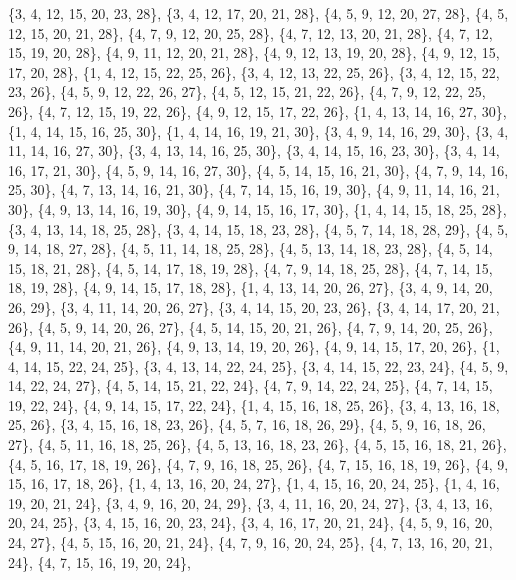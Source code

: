 \documentclass[11pt,a4paper]{article}
\begin{document}
{\{3, 4, 12, 15, 20, 23, 28\}, \{3, 4, 12, 17, 20, 21, 28\}, \{4, 5, 9, 12, 20, 27, 28\}, \{4, 5, 12, 15, 20, 21, 28\}, \{4, 7, 9, 12, 20, 25, 28\},
\{4, 7, 12, 13, 20, 21, 28\}, \{4, 7, 12, 15, 19, 20, 28\}, \{4, 9, 11, 12, 20, 21, 28\}, \{4, 9, 12, 13, 19, 20, 28\}, \{4, 9, 12, 15, 17, 20, 28\},
\{1, 4, 12, 15, 22, 25, 26\}, \{3, 4, 12, 13, 22, 25, 26\}, \{3, 4, 12, 15, 22, 23, 26\}, \{4, 5, 9, 12, 22, 26, 27\}, \{4, 5, 12, 15, 21, 22, 26\},
\{4, 7, 9, 12, 22, 25, 26\}, \{4, 7, 12, 15, 19, 22, 26\}, \{4, 9, 12, 15, 17, 22, 26\}, \{1, 4, 13, 14, 16, 27, 30\}, \{1, 4, 14, 15, 16, 25, 30\},
\{1, 4, 14, 16, 19, 21, 30\}, \{3, 4, 9, 14, 16, 29, 30\}, \{3, 4, 11, 14, 16, 27, 30\}, \{3, 4, 13, 14, 16, 25, 30\}, \{3, 4, 14, 15, 16, 23, 30\},
\{3, 4, 14, 16, 17, 21, 30\}, \{4, 5, 9, 14, 16, 27, 30\}, \{4, 5, 14, 15, 16, 21, 30\}, \{4, 7, 9, 14, 16, 25, 30\}, \{4, 7, 13, 14, 16, 21, 30\},
\{4, 7, 14, 15, 16, 19, 30\}, \{4, 9, 11, 14, 16, 21, 30\}, \{4, 9, 13, 14, 16, 19, 30\}, \{4, 9, 14, 15, 16, 17, 30\}, \{1, 4, 14, 15, 18, 25, 28\},
\{3, 4, 13, 14, 18, 25, 28\}, \{3, 4, 14, 15, 18, 23, 28\}, \{4, 5, 7, 14, 18, 28, 29\}, \{4, 5, 9, 14, 18, 27, 28\}, \{4, 5, 11, 14, 18, 25, 28\},
\{4, 5, 13, 14, 18, 23, 28\}, \{4, 5, 14, 15, 18, 21, 28\}, \{4, 5, 14, 17, 18, 19, 28\}, \{4, 7, 9, 14, 18, 25, 28\}, \{4, 7, 14, 15, 18, 19, 28\},
\{4, 9, 14, 15, 17, 18, 28\}, \{1, 4, 13, 14, 20, 26, 27\}, \{3, 4, 9, 14, 20, 26, 29\}, \{3, 4, 11, 14, 20, 26, 27\}, \{3, 4, 14, 15, 20, 23, 26\},
\{3, 4, 14, 17, 20, 21, 26\}, \{4, 5, 9, 14, 20, 26, 27\}, \{4, 5, 14, 15, 20, 21, 26\}, \{4, 7, 9, 14, 20, 25, 26\}, \{4, 9, 11, 14, 20, 21, 26\},
\{4, 9, 13, 14, 19, 20, 26\}, \{4, 9, 14, 15, 17, 20, 26\}, \{1, 4, 14, 15, 22, 24, 25\}, \{3, 4, 13, 14, 22, 24, 25\}, \{3, 4, 14, 15, 22, 23, 24\},
\{4, 5, 9, 14, 22, 24, 27\}, \{4, 5, 14, 15, 21, 22, 24\}, \{4, 7, 9, 14, 22, 24, 25\}, \{4, 7, 14, 15, 19, 22, 24\}, \{4, 9, 14, 15, 17, 22, 24\},
\{1, 4, 15, 16, 18, 25, 26\}, \{3, 4, 13, 16, 18, 25, 26\}, \{3, 4, 15, 16, 18, 23, 26\}, \{4, 5, 7, 16, 18, 26, 29\}, \{4, 5, 9, 16, 18, 26, 27\},
\{4, 5, 11, 16, 18, 25, 26\}, \{4, 5, 13, 16, 18, 23, 26\}, \{4, 5, 15, 16, 18, 21, 26\}, \{4, 5, 16, 17, 18, 19, 26\}, \{4, 7, 9, 16, 18, 25, 26\},
\{4, 7, 15, 16, 18, 19, 26\}, \{4, 9, 15, 16, 17, 18, 26\}, \{1, 4, 13, 16, 20, 24, 27\}, \{1, 4, 15, 16, 20, 24, 25\}, \{1, 4, 16, 19, 20, 21, 24\},
\{3, 4, 9, 16, 20, 24, 29\}, \{3, 4, 11, 16, 20, 24, 27\}, \{3, 4, 13, 16, 20, 24, 25\}, \{3, 4, 15, 16, 20, 23, 24\}, \{3, 4, 16, 17, 20, 21, 24\},
\{4, 5, 9, 16, 20, 24, 27\}, \{4, 5, 15, 16, 20, 21, 24\}, \{4, 7, 9, 16, 20, 24, 25\}, \{4, 7, 13, 16, 20, 21, 24\}, \{4, 7, 15, 16, 19, 20, 24\},
}
\end{document}
